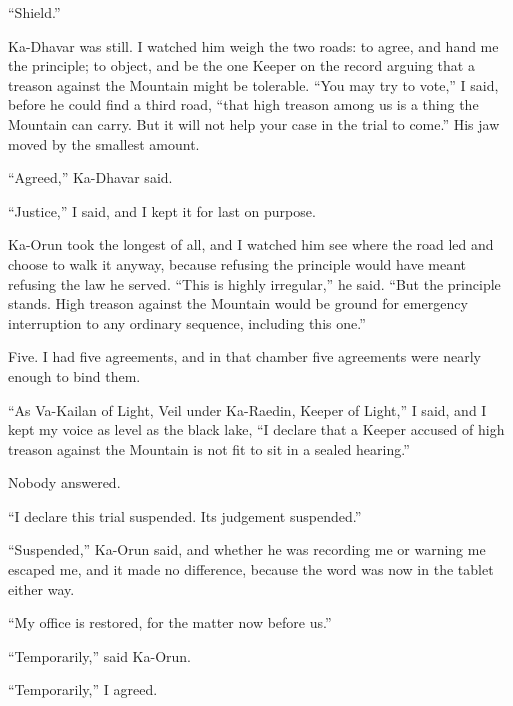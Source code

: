 ``Shield.''\par

Ka-Dhavar was still. I watched him weigh the two roads: to agree, and hand me the principle; to object, and be the one Keeper on the record arguing that a treason against the Mountain might be tolerable. ``You may try to vote,'' I said, before he could find a third road, ``that high treason among us is a thing the Mountain can carry. But it will not help your case in the trial to come.'' His jaw moved by the smallest amount.\par

``Agreed,'' Ka-Dhavar said.\par

``Justice,'' I said, and I kept it for last on purpose.\par

Ka-Orun took the longest of all, and I watched him see where the road led and choose to walk it anyway, because refusing the principle would have meant refusing the law he served. ``This is highly irregular,'' he said. ``But the principle stands. High treason against the Mountain would be ground for emergency interruption to any ordinary sequence, including this one.''\par
 
Five. I had five agreements, and in that chamber five agreements were nearly enough to bind them.\par
 
``As Va-Kailan of Light, Veil under Ka-Raedin, Keeper of Light,'' I said, and I kept my voice as level as the black lake, ``I declare that a Keeper accused of high treason against the Mountain is not fit to sit in a sealed hearing.''\par
 
Nobody answered.\par

``I declare this trial suspended. Its judgement suspended.''\par
 
``Suspended,'' Ka-Orun said, and whether he was recording me or warning me escaped me, and it made no difference, because the word was now in the tablet either way.\par
 
``My office is restored, for the matter now before us.''\par
 
``Temporarily,'' said Ka-Orun.\par
 
``Temporarily,'' I agreed.

